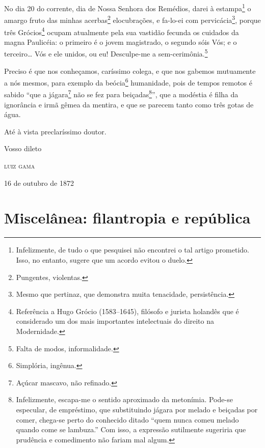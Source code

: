 No dia 20 do corrente, dia de Nossa Senhora dos Remédios, darei à
estampa\footnote{ Infelizmente, de tudo o que pesquisei não encontrei o
  tal artigo prometido. Isso, no entanto, sugere que um acordo evitou o
  duelo.} o amargo fruto das minhas acerbas\footnote{ Pungentes,
  violentas.} elocubrações, e fa-lo-ei com pervicácia\footnote{ Mesmo
  que pertinaz, que demonstra muita tenacidade, persistência.}, porque
três Grócios\footnote{ Referência a Hugo Grócio (1583--1645), filósofo e
  jurista holandês que é considerado um dos mais importantes
  intelectuais do direito na Modernidade.} ocupam atualmente pela sua
vastidão fecunda os cuidados da magna Paulicéia: o primeiro é o jovem
magistrado, o segundo sóis Vós; e o terceiro\ldots{} Vós e ele unidos, ou eu!
Desculpe-me a sem-cerimônia.\footnote{ Falta de modos, informalidade.}

Preciso é que nos conheçamos, caríssimo colega, e que nos gabemos
mutuamente a nós mesmos, para exemplo da beócia\footnote{ Simplória,
  ingênua.} humanidade, pois de tempos remotos é sabido ``que a
jágara\footnote{ Açúcar mascavo, não refinado.} não se fez para
beiçadas\footnote{ Infelizmente, escapa-me o sentido aproximado da
  metonímia. Pode-se especular, de empréstimo, que substituindo jágara
  por melado e beiçadas por comer, chega-se perto do conhecido ditado
  ``quem nunca comeu melado quando come se lambuza.'' Com isso, a
  expressão sutilmente sugeriria que prudência e comedimento não fariam
  mal algum.}'', que a modéstia é filha da ignorância e irmã gêmea da
mentira, e que se parecem tanto como três gotas de água.

Até à vista preclaríssimo doutor.

\begin{flushright}
Vosso dileto

\textsc{luiz gama}

16 de outubro de 1872
\end{flushright}

\part{Miscelânea: filantropia e república}

